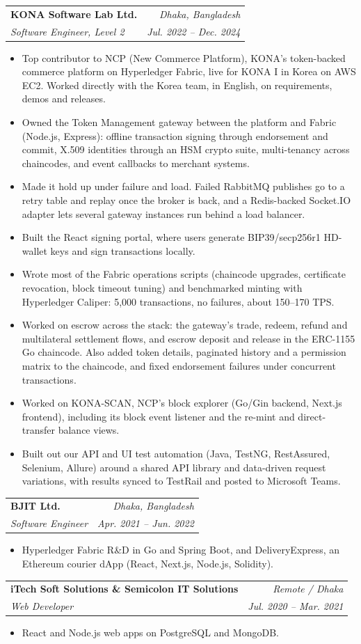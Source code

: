 \documentclass[letterpaper,11pt]{article}
\makeatletter
\newcommand{\resumeItem}[1]{\item\small{{#1 \vspace{-2pt}}}}
\newcommand{\resumeSubheading}[4]{
  \vspace{-2pt}\item
    \begin{tabular*}{0.97\textwidth}[t]{l@{\extracolsep{\fill}}r}
      \textbf{#1} & #2 \\
      \textit{\small#3} & \textit{\small #4} \\
    \end{tabular*}\vspace{-7pt}
}
\newcommand{\resumeItemListStart}{\begin{itemize}[leftmargin=0.2in]}
\newcommand{\resumeItemListEnd}{\end{itemize}\vspace{-5pt}}
\makeatother
\begin{document}
\resumeSubheading
{KONA Software Lab Ltd.}{\emph{Dhaka, Bangladesh}}
{Software Engineer, Level 2}{\emph{Jul. 2022 -- Dec. 2024}}
\resumeItemListStart
  \resumeItem{Top contributor to NCP (New Commerce Platform), KONA's token-backed commerce platform on Hyperledger Fabric, live for KONA I in Korea on AWS EC2. Worked directly with the Korea team, in English, on requirements, demos and releases.}
  \resumeItem{Owned the Token Management gateway between the platform and Fabric (Node.js, Express): offline transaction signing through endorsement and commit, X.509 identities through an HSM crypto suite, multi-tenancy across chaincodes, and event callbacks to merchant systems.}
  \resumeItem{Made it hold up under failure and load. Failed RabbitMQ publishes go to a retry table and replay once the broker is back, and a Redis-backed Socket.IO adapter lets several gateway instances run behind a load balancer.}
  \resumeItem{Built the React signing portal, where users generate BIP39/secp256r1 HD-wallet keys and sign transactions locally.}
  \resumeItem{Wrote most of the Fabric operations scripts (chaincode upgrades, certificate revocation, block timeout tuning) and benchmarked minting with Hyperledger Caliper: 5,000 transactions, no failures, about 150--170 TPS.}
  \resumeItem{Worked on escrow across the stack: the gateway's trade, redeem, refund and multilateral settlement flows, and escrow deposit and release in the ERC-1155 Go chaincode. Also added token details, paginated history and a permission matrix to the chaincode, and fixed endorsement failures under concurrent transactions.}
  \resumeItem{Worked on KONA-SCAN, NCP's block explorer (Go/Gin backend, Next.js frontend), including its block event listener and the re-mint and direct-transfer balance views.}
  \resumeItem{Built out our API and UI test automation (Java, TestNG, RestAssured, Selenium, Allure) around a shared API library and data-driven request variations, with results synced to TestRail and posted to Microsoft Teams.}
\resumeItemListEnd

\resumeSubheading
{BJIT Ltd.}{\emph{Dhaka, Bangladesh}}
{Software Engineer}{\emph{Apr. 2021 -- Jun. 2022}}
\resumeItemListStart
  \resumeItem{Hyperledger Fabric R\&D in Go and Spring Boot, and DeliveryExpress, an Ethereum courier dApp (React, Next.js, Node.js, Solidity).}
\resumeItemListEnd

\resumeSubheading
{iTech Soft Solutions \& Semicolon IT Solutions}{\emph{Remote / Dhaka}}
{Web Developer}{\emph{Jul. 2020 -- Mar. 2021}}
\resumeItemListStart
  \resumeItem{React and Node.js web apps on PostgreSQL and MongoDB.}
\resumeItemListEnd
\end{document}
